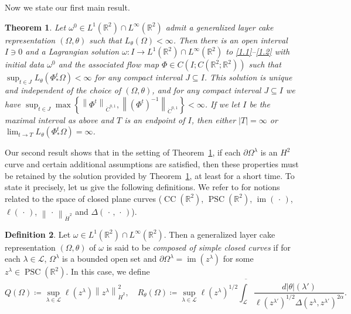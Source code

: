 \documentclass[reqno,centertags,12pt]{amsart}
\newtheorem{theorem}{Theorem}[section]
\theoremstyle{definition}
\newtheorem{definition}[theorem]{Definition}
\numberwithin{equation}{section}
\newcommand{\norm}[1]{\left\|#1\right\|}
\newcommand{\set}[1]{\left\{ #1 \right\}}
\newcommand{\bbR}{{\mathbb{R}}}
\newcommand{\tht}{\theta}
\begin{document}
Now we state our first main result.

\begin{theorem}\label{T1.2}
    Let $\omega^{0}\in L^{1}(\bbR^{2})\cap L^{\infty}(\bbR^{2})$ admit
    a generalized layer cake representation $(\Omega,\theta)$ such that
    $L_{\tht}(\Omega)<\infty$. Then there is an open interval $I\ni 0$ and a Lagrangian solution
    $\omega\colon I\to L^{1}(\bbR^{2})\cap L^{\infty}(\bbR^{2})$ to \eqref{1.1}--\eqref{1.2}
    with initial data $\omega^{0}$ and
    the associated flow map $\Phi\in C\left(I;C(\bbR^{2};\bbR^{2})\right)$ such that
    $\sup_{t\in J}L_{\tht}(\Phi_{*}^{t}\Omega) < \infty$ for any compact interval $J\subseteq I$.
    This solution is unique and independent of the choice of $(\Omega,\theta)$, and for any compact interval $J\subseteq I$ we have  $\sup_{t\in J}\max\set{\norm{\Phi^{t}}_{\dot{C}^{0,1}},    \norm{(\Phi^{t})^{-1}}_{\dot{C}^{0,1}}}<\infty$.
  If we let $I$ be the maximal interval as above and  $T$ is an endpoint of $I$, then either $|T|=\infty$  or
    $\lim_{t\to T}L_{\tht}(\Phi_{*}^{t}\Omega) = \infty$.
\end{theorem}

Our second result shows that in the setting of Theorem~\ref{T1.2},
if each $\partial\Omega^{\lambda}$ is an $H^{2}$ curve
and certain additional assumptions are satisfied, then these properties must be retained
by the solution provided by Theorem~\ref{T1.2}, at least for a short time.
To state it precisely, let us give the following definitions.
We refer to \cite{JeoZlaTouching} for notions related to the space of closed plane curves
($\operatorname{CC}(\bbR^{2})$, $\operatorname{PSC}(\bbR^{2})$,
$\operatorname{im}(\,\cdot\,)$, $\ell(\,\cdot\,)$, $\norm{\,\cdot\,}_{\dot{H}^{2}}$
and $\Delta(\,\cdot\,,\,\cdot\,)$).

\begin{definition}
    Let $\omega\in L^{1}(\bbR^{2})\cap L^{\infty}(\bbR^{2})$.
    Then a generalized layer cake representation $(\Omega,\theta)$
    of $\omega$ is said to be \emph{composed of simple closed curves} if for each
    $\lambda\in\mathcal{L}$, $\Omega^{\lambda}$ is a bounded open set and
    $\partial\Omega^{\lambda} = \operatorname{im}(z^{\lambda})$
    for some $z^{\lambda}\in\operatorname{PSC}(\bbR^{2})$.
    In this case, we define
    \begin{equation*}
        Q(\Omega) \coloneqq \sup_{\lambda\in\mathcal{L}}
        \ell(z^{\lambda})\norm{z^{\lambda}}_{\dot{H}^{2}}^{2},\quad
        R_{\tht}(\Omega) \coloneqq \sup_{\lambda\in\mathcal{L}}
        \ell(z^{\lambda})^{1/2}\overline{\int_{\mathcal{L}}}\frac{d|\theta|(\lambda')}
        {\ell(z^{\lambda'})^{1/2}\Delta(z^{\lambda},z^{\lambda'})^{2\alpha}}.
    \end{equation*}
\end{definition}
\end{document}
